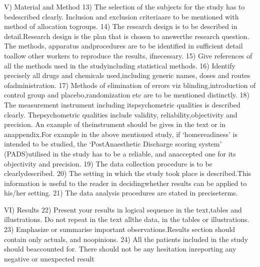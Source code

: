 V) Material and Method
13) The selection of the subjects for the study has to bedescribed clearly. Inclusion and exclusion criteriaare to be mentioned with method of allocation togroups.
14) The research design is to be described in detail.Research design is the plan that is chosen to answerthe research question.  The methods, apparatus  andprocedures are to be identified  in sufficient detail toallow other workers to reproduce the results, ifnecessary.
15) Give references of  all the methods used in the studyincluding statistical methods.
16) Identify precisely all drugs and chemicals used,including generic names, doses and routes ofadministration.
17) Methods of elimination of errors viz blinding,introduction of control group and placebo,randomization etc are to be mentioned distinctly.
18) The measurement instrument including itspsychometric qualities is described clearly.  Thepsychometric qualities include validity, reliability,objectivity  and precision.  An example of theinstrument should be gives in the text or in anappendix.For example in the above mentioned study, if ‘homereadiness’ is intended to be studied, the ‘PostAnaesthetic Discharge scoring system’ (PADS)utilised in the study has to be a reliable, and anaccepted one for its objectivity and precision.
19) The data collection procedure is to be clearlydescribed.
20) The setting in which the study took place is described.This information is useful to the reader in decidingwhether results can be applied to his/her setting.
21) The data analysis procedures are stated in preciseterms.

VI) Results
22) Present your results in logical sequence  in the text,tables and illustrations.  Do not repeat in the text allthe data, in the tables or illustrations.
23) Emphasize or summarise important observations.Results  section should contain only  actuals, and noopinions.
24) All the patients included in the study should beaccounted for. There should not be any hesitation inreporting any negative or unexpected result

